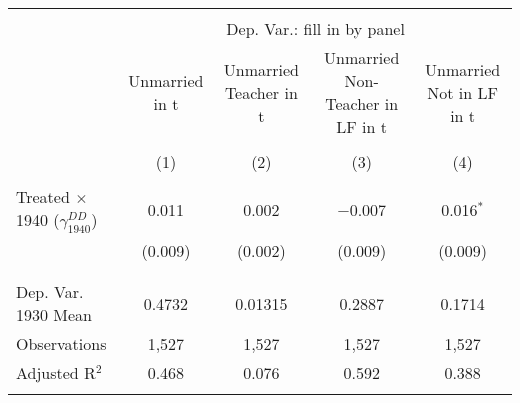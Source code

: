 
\begin{tabular}{@{\extracolsep{5pt}}lcccc} 
\\[-1.8ex]\hline 
\hline \\[-1.8ex] 
 & \multicolumn{4}{c}{Dep. Var.: fill in by panel} \\ 
\cline{2-5} 
 & Unmarried in t & Unmarried Teacher in t & Unmarried Non-Teacher in LF in t & Unmarried Not in LF in t \\ 
\\[-1.8ex] & (1) & (2) & (3) & (4)\\ 
\hline \\[-1.8ex] 
 Treated $\times$ 1940 ($\gamma_{1940}^{DD}$) & 0.011 & 0.002 & $-$0.007 & 0.016$^{*}$ \\ 
  & (0.009) & (0.002) & (0.009) & (0.009) \\ 
  & & & & \\ 
\hline \\[-1.8ex] 
Dep. Var. 1930 Mean & 0.4732 & 0.01315 & 0.2887 & 0.1714 \\ 
Observations & 1,527 & 1,527 & 1,527 & 1,527 \\ 
Adjusted R$^{2}$ & 0.468 & 0.076 & 0.592 & 0.388 \\ 
\hline 
\hline \\[-1.8ex] 
\end{tabular} 
